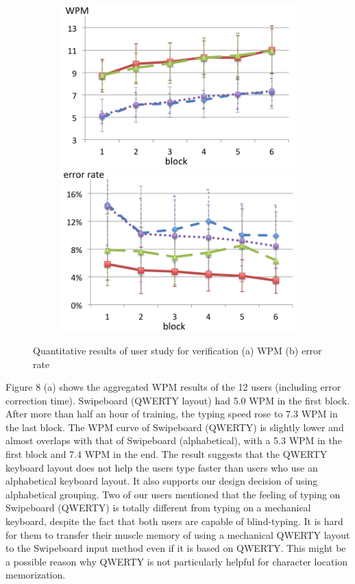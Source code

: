 \begin{figure}[t]
  \begin{subfigure}{1\columnwidth}
  \centering
  \includegraphics[width=.8\columnwidth]{figures/F9-1.png}
  \caption{}
  \includegraphics[width=.8\columnwidth]{figures/F9-2.png}
  \caption{}
  \label{fig:f9}
  \end{subfigure}
  \caption{ Quantitative results of user study for \papertitle verification (a) WPM (b) error rate}
\end{figure}

Figure 8 (a) shows the aggregated WPM results of the 12 users (including error correction time). Swipeboard (QWERTY layout) had 5.0 WPM in the first block. After more than half an hour of training, the typing speed rose to 7.3 WPM in the last block. The WPM curve of Swipeboard (QWERTY) is slightly lower and almost overlaps with that of Swipeboard (alphabetical), with a 5.3 WPM in the first block and 7.4 WPM in the end. The result suggests that the QWERTY keyboard layout does not help the users type faster than users who use an alphabetical keyboard layout. It also supports our design decision of using alphabetical grouping. Two of our users mentioned that the feeling of typing on Swipeboard (QWERTY) is totally different from typing on a mechanical keyboard, despite the fact that both users are capable of blind-typing. It is hard for them to transfer their muscle memory of using a mechanical QWERTY layout to the Swipeboard input method even if it is based on QWERTY. This might be a possible reason why QWERTY is not particularly helpful for character location memorization.

